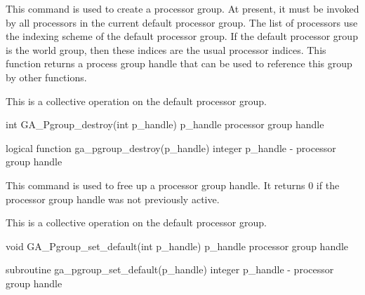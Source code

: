 \documentclass[12pt]{article}
\begin{document}
\begin{desc}

  This command is used to create a processor group. At present, it
  must be invoked by all processors in the current default processor
  group. The list of processors use the indexing scheme of the default
  processor group. If the default processor group is the world group,
  then these indices are the usual processor indices. This function
  returns a process group handle that can be used to reference this
  group by other functions.

  This is a collective operation on the default processor group.

\end{desc}


\begin{capi}
int GA_Pgroup_destroy(int p_handle)
   p_handle                       processor group handle           \access{[input]} 
\end{capi}

\begin{fapi}
logical function ga_pgroup_destroy(p_handle)
   integer       p_handle           - processor group handle       \access{[input]} 
\end{fapi}

\begin{desc}

  This command is used to free up a processor group handle. It returns
  0 if the processor group handle was not previously active.

  This is a collective operation on the default processor group.

\end{desc}


\begin{capi}
void GA_Pgroup_set_default(int p_handle)
   p_handle                       processor group handle           \access{[input]} 
\end{capi}

\begin{fapi}
subroutine ga_pgroup_set_default(p_handle)
   integer       p_handle           - processor group handle       \access{[input]} 
\end{fapi}
\end{document}
